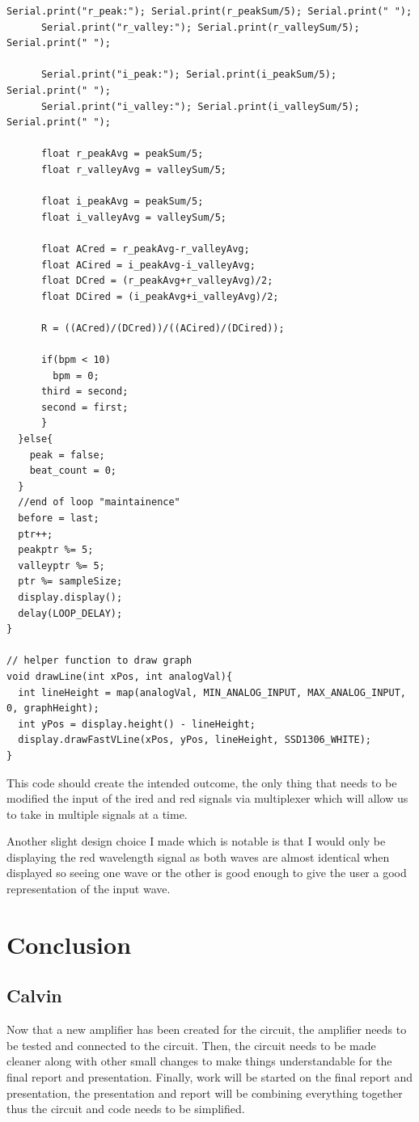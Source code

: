 \documentclass{article}
\begin{document}
\begin{lstlisting}[language=Arduino, caption=SpO2 Pulsing Code]
      Serial.print("r_peak:"); Serial.print(r_peakSum/5); Serial.print(" ");
      Serial.print("r_valley:"); Serial.print(r_valleySum/5); Serial.print(" ");
      
      Serial.print("i_peak:"); Serial.print(i_peakSum/5); Serial.print(" ");
      Serial.print("i_valley:"); Serial.print(i_valleySum/5); Serial.print(" ");

      float r_peakAvg = peakSum/5;
      float r_valleyAvg = valleySum/5;
      
      float i_peakAvg = peakSum/5;
      float i_valleyAvg = valleySum/5;
 
      float ACred = r_peakAvg-r_valleyAvg;
      float ACired = i_peakAvg-i_valleyAvg;         
      float DCred = (r_peakAvg+r_valleyAvg)/2;
      float DCired = (i_peakAvg+i_valleyAvg)/2;  
      
      R = ((ACred)/(DCred))/((ACired)/(DCired));
      
      if(bpm < 10)
        bpm = 0;
      third = second;
      second = first;
      }
  }else{
    peak = false;
    beat_count = 0;
  }
  //end of loop "maintainence"
  before = last;
  ptr++;
  peakptr %= 5;
  valleyptr %= 5;
  ptr %= sampleSize;
  display.display();
  delay(LOOP_DELAY);
}

// helper function to draw graph
void drawLine(int xPos, int analogVal){
  int lineHeight = map(analogVal, MIN_ANALOG_INPUT, MAX_ANALOG_INPUT, 0, graphHeight);
  int yPos = display.height() - lineHeight;
  display.drawFastVLine(xPos, yPos, lineHeight, SSD1306_WHITE);
}
\end{lstlisting}
This code should create the intended outcome, the only thing that needs to be modified the input of the ired and red signals via multiplexer which will allow us to take in multiple signals at a time.

Another slight design choice I made which is notable is that I would only be displaying the red wavelength signal as both waves are almost identical when displayed so seeing one wave or the other is good enough to give the user a good representation of the input wave.
\newpage
\section{Conclusion}
\subsection{Calvin}
Now that a new amplifier has been created for the circuit, the amplifier needs to be tested and connected to the circuit. Then, the circuit needs to be made cleaner along with other small changes to make things understandable for the final report and presentation. Finally, work will be started on the final report and presentation, the presentation and report will be combining everything together thus the circuit and code needs to be simplified.
\end{document}
